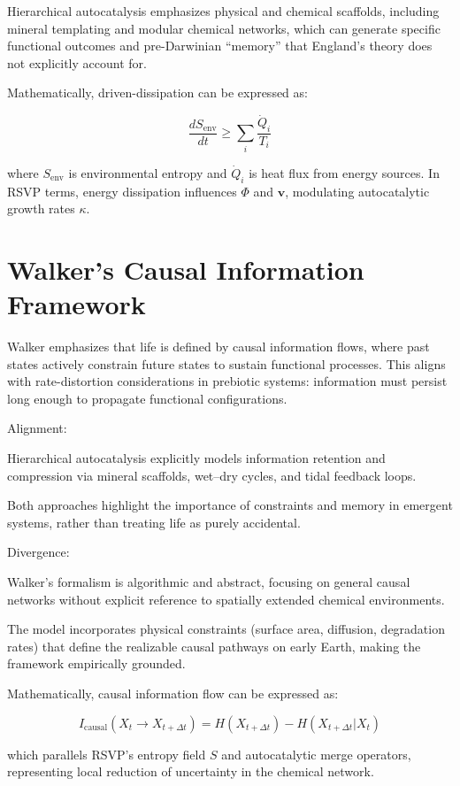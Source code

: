 \documentclass{book}
\begin{document}
Hierarchical autocatalysis emphasizes physical and chemical scaffolds, including mineral templating and modular chemical networks, which can generate specific functional outcomes and pre-Darwinian “memory” that England’s theory does not explicitly account for.

Mathematically, driven-dissipation can be expressed as:

\[\frac{dS_\text{env}}{dt} \ge \sum_i \frac{\dot{Q}_i}{T_i}\]

where $S_\text{env}$ is environmental entropy and $\dot{Q}_i$ is heat flux from energy sources. In RSVP terms, energy dissipation influences $\Phi$ and $\mathbf{v}$, modulating autocatalytic growth rates $\kappa$.

\section{Walker’s Causal Information Framework}
Walker emphasizes that life is defined by causal information flows, where past states actively constrain future states to sustain functional processes. This aligns with rate-distortion considerations in prebiotic systems: information must persist long enough to propagate functional configurations.

Alignment:

Hierarchical autocatalysis explicitly models information retention and compression via mineral scaffolds, wet–dry cycles, and tidal feedback loops.

Both approaches highlight the importance of constraints and memory in emergent systems, rather than treating life as purely accidental.

Divergence:

Walker’s formalism is algorithmic and abstract, focusing on general causal networks without explicit reference to spatially extended chemical environments.

The model incorporates physical constraints (surface area, diffusion, degradation rates) that define the realizable causal pathways on early Earth, making the framework empirically grounded.

Mathematically, causal information flow can be expressed as:

\[I_\text{causal}(X_{t} \to X_{t+\Delta t}) = H(X_{t+\Delta t}) - H(X_{t+\Delta t} | X_t)\]

which parallels RSVP’s entropy field $S$ and autocatalytic merge operators, representing local reduction of uncertainty in the chemical network.
\end{document}
